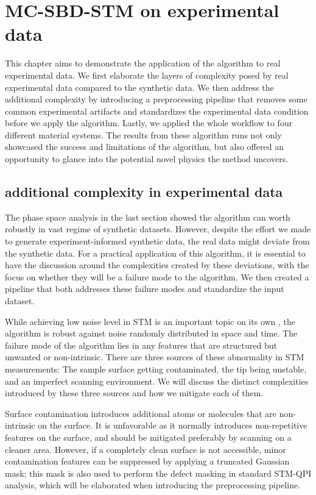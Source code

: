\chapter{MC-SBD-STM on experimental data}
This chapter aims to demonstrate the application of the algorithm to real experimental data. We first elaborate the layers of complexity posed by real experimental data compared to the synthetic data. We then address the additional complexity by introducing a preprocessing pipeline that removes some common experimental artifacts and standardizes the experimental data condition before we apply the algorithm. Lastly, we applied the whole workflow to four different material systems. The results from these algorithm runs not only showcased the success and limitations of the algorithm, but also offered an opportunity to glance into the potential novel physics the method uncovers. 

\section{additional complexity in experimental data}
The phase space analysis in the last section showed the algorithm can worth robustly in vast regime of synthetic datasets. However, despite the effort we made to generate experiment-informed synthetic data, the real data might deviate from the synthetic data. For a practical application of this algorithm, it is essential to have the discussion around the complexities created by these deviations, with the focus on whether they will be a failure mode to the algorithm. We then created a pipeline that both addresses these failure modes and standardize the input dataset.

While achieving low noise level in \ac{STM} is an important topic on its own \cite{geAchievingLowNoise2019}, the algorithm is robust against noise randomly distributed in space and time. The failure mode of the algorithm lies in any features that are structured but unwanted or non-intrinsic. There are three sources of these abnormality in \ac{STM} measurements: The sample surface getting contaminated, the tip being unstable, and an imperfect scanning environment. We will discuss the distinct complexities introduced by these three sources and how we mitigate each of them.  

Surface contamination introduces additional atoms or molecules that are non-intrinsic on the surface. It is unfavorable as it normally introduces non-repetitive features on the surface, and should be mitigated preferably by scanning on a cleaner area. However, if a completely clean surface is not accessible, minor contamination features can be suppressed by applying a truncated Gaussian mask; this mask is also used to perform the defect masking in standard STM-QPI analysis, which will be elaborated when introducing the preprocessing pipeline.


